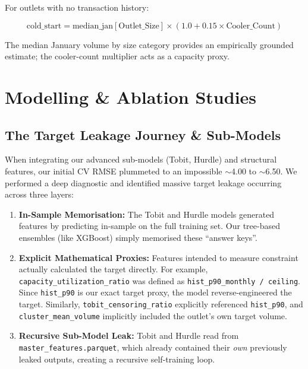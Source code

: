 \documentclass[10.75pt, a4paper]{article}
\begin{document}
For outlets with no transaction history:

\begin{equation}
\text{cold\_start} = \text{median\_jan}[\text{Outlet\_Size}] \times (1.0 + 0.15 \times \text{Cooler\_Count})
\end{equation}

The median January volume by size category provides an empirically grounded estimate; the cooler-count multiplier acts as a capacity proxy.

\section{Modelling \& Ablation Studies}

\subsection{The Target Leakage Journey \& Sub-Models}

When integrating our advanced sub-models (Tobit, Hurdle) and structural features, our initial CV RMSE plummeted to an impossible $\sim$4.00 to $\sim$6.50. We performed a deep diagnostic and identified massive target leakage occurring across three layers:
\begin{enumerate}
    \item \textbf{In-Sample Memorisation:} The Tobit and Hurdle models generated features by predicting in-sample on the full training set. Our tree-based ensembles (like XGBoost) simply memorised these ``answer keys''.
    \item \textbf{Explicit Mathematical Proxies:} Features intended to measure constraint actually calculated the target directly. For example, \texttt{capacity\_utilization\_ratio} was defined as \texttt{hist\_p90\_monthly / ceiling}. Since \texttt{hist\_p90} is our exact target proxy, the model reverse-engineered the target. Similarly, \texttt{tobit\_censoring\_ratio} explicitly referenced \texttt{hist\_p90}, and \texttt{cluster\_mean\_volume} implicitly included the outlet's own target volume.
    \item \textbf{Recursive Sub-Model Leak:} Tobit and Hurdle read from \texttt{master\_features.parquet}, which already contained their \textit{own} previously leaked outputs, creating a recursive self-training loop.
\end{enumerate}
\end{document}
